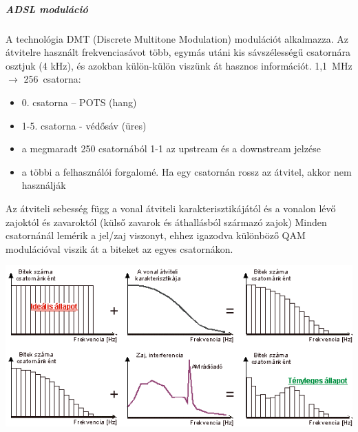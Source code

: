 \subparagraph{ADSL moduláció} A technológia DMT (Discrete Multitone Modulation) modulációt alkalmazza. Az átvitelre használt frekvenciasávot több, egymás utáni kis sávszélességű csatornára osztjuk (4 kHz), és azokban külön-külön viszünk át hasznos információt. 1,1~MHz $\rightarrow$ 256~csatorna:
\begin{itemize}[nosep]
	\item 0. csatorna -- POTS (hang)
	\item 1-5. csatorna - védősáv (üres)
	\item a megmaradt 250 csatornából 1-1 az upstream és a downstream jelzése
	\item a többi a felhasználói forgalomé. Ha egy csatornán rossz az átvitel, akkor nem használják
\end{itemize}
Az átviteli sebesség függ a vonal átviteli karakterisztikájától és a vonalon lévő zajoktól és zavaroktól (külső zavarok és áthallásból származó zajok)
Minden csatornánál lemérik a jel/zaj viszonyt, ehhez igazodva különböző QAM modulációval viszik át a biteket az egyes csatornákon.
\begin{center}
	\includegraphics[width=0.7\linewidth]{fig/12-DMT}
\end{center}



